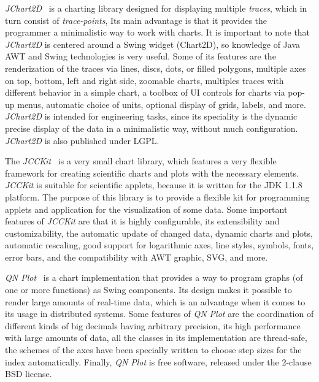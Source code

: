\emph{JChart2D}~\cite{JChart2D} is a charting library designed for displaying
multiple \emph{traces}, which in turn consist of \emph{trace-points},
Its main advantage is that it provides the programmer a minimalistic way to work with charts.
It is important to note that \emph{JChart2D} is centered around a Swing widget (Chart2D),
so knowledge of Java AWT and Swing technologies is very useful.
Some of its features are the renderization of the traces via lines, discs, dots, or filled polygons, multiple axes on top,
bottom, left and right side, zoomable charts, multiples traces with different behavior in a simple chart,
a toolbox of UI controls for charts via pop-up menus, automatic choice of units, optional display of grids, labels,
and more.
\emph{JChart2D} is intended for engineering tasks, since its speciality is the dynamic precise display of the data in
a minimalistic way, without much configuration.
\emph{JChart2D} is also published under LGPL.

The \emph{JCCKit}~\cite{JCCKit} is a very small chart library, which features a very flexible framework for creating
scientific charts and plots with the necessary elements.
\emph{JCCKit} is suitable for scientific applets, because it is written for the JDK 1.1.8 platform.
The purpose of this library is to provide a flexible kit for programming applets and application for the visualization
of some data.
Some important features of \emph{JCCKit} are that it is highly configurable,
its extensibility and
customizability, the automatic update of changed data, dynamic charts and plots, automatic
rescaling, good support for logarithmic axes, line styles, symbols, fonts,
error bars, and the compatibility with AWT graphic, SVG, and more.

\emph{QN Plot}~\cite{QNPlot} is a chart implementation that provides a way to program graphs (of one or more functions)
as Swing components. Its design makes it possible to render large amounts of real-time data,
which is an advantage when it comes to its usage in distributed systems.
Some features of \emph{QN Plot} are the coordination of different kinds of big decimals having arbitrary precision,
its high performance with large amounts of data, all the classes in its implementation are thread-safe,
the schemes of the axes have been specially written to choose step sizes for the index automatically.
Finally, \emph{QN Plot} is free software, released under the 2-clause BSD license.

